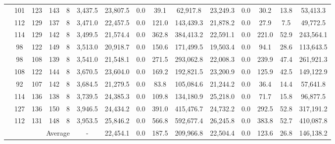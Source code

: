 \documentclass{article}
\begin{document}
\begin{table}[ht!]
{\begin{tabular}{lcccccccccccccc}
     & 101 & 123 & 143 & 8 & 3,437.5 & 23,807.5 & 0.0 & 39.1 & 62,917.8 & 23,249.3 & 0.0 & 30.2 & 13.8 & 53,413.3 \\
     & 112 & 129 & 137 & 8 & 3,471.0 & 22,457.5 & 0.0 & 121.0 & 143,439.3 & 21,878.2 & 0.0 & 27.9 & 7.5 & 49,772.5 \\
     & 114 & 129 & 142 & 8 & 3,499.5 & 21,574.4 & 0.0 & 362.8 & 384,413.2 & 22,591.1 & 0.0 & 221.0 & 52.9 & 243,564.1 \\
     & 98 & 122 & 149 & 8 & 3,513.0 & 20,918.7 & 0.0 & 150.6 & 171,499.5 & 19,503.4 & 0.0 & 94.1 & 28.6 & 113,643.5 \\
     & 98 & 108 & 139 & 8 & 3,541.0 & 21,548.1 & 0.0 & 271.5 & 293,062.8 & 22,008.3 & 0.0 & 239.9 & 47.4 & 261,921.3 \\
     & 108 & 122 & 144 & 8 & 3,670.5 & 23,604.0 & 0.0 & 169.2 & 192,821.5 & 23,200.9 & 0.0 & 125.9 & 42.5 & 149,122.9 \\
     & 92 & 107 & 142 & 8 & 3,684.5 & 21,279.5 & 0.0 & 83.8 & 105,084.6 & 21,244.2 & 0.0 & 36.4 & 14.4 & 57,641.8 \\
     & 114 & 136 & 138 & 8 & 3,739.5 & 24,385.3 & 0.0 & 109.8 & 134,180.9 & 25,218.0 & 0.0 & 71.7 & 15.8 & 96,877.5 \\
     & 127 & 136 & 150 & 8 & 3,946.5 & 24,434.2 & 0.0 & 391.0 & 415,476.7 & 24,732.2 & 0.0 & 292.5 & 52.8 & 317,191.2 \\
     & 112 & 131 & 148 & 8 & 3,953.5 & 25,846.2 & 0.0 & 566.8 & 592,677.4 & 26,245.8 & 0.0 & 383.8 & 52.7 & 410,087.8 \\
     \cmidrule(l){1-10} \cmidrule(l){11-15}
     \multicolumn{5}{r}{Average} & - & 22,454.1 & 0.0 & 187.5 & 209,966.8 & 22,504.4 & 0.0 & 123.6 & 26.8 & 146,138.2 \\
    \bottomrule
    \end{tabular}
    }
\end{table}

\begin{table}[!ht]
    \centering
    \small
    \caption{Comparison of the average results with and without shift and overtime constraints}
    \label{tab:lift_shift_constraints}
\end{table}
\end{document}
